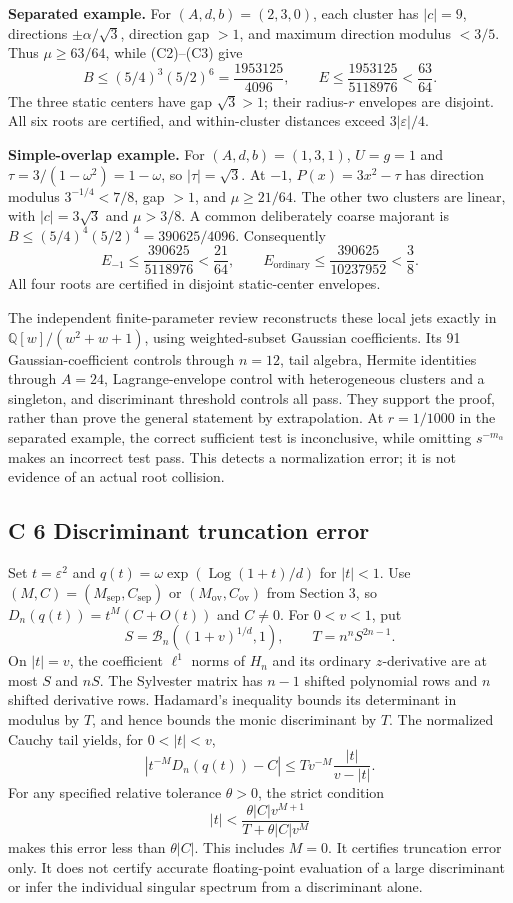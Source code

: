 \documentclass[
  11pt,
]{article}
\begin{document}
\textbf{Separated example.} For \((A,d,b)=(2,3,0)\), each cluster
has \(|c|=9\), directions \(\pm\alpha/\sqrt3\), direction gap
\(>1\), and maximum direction modulus \(<3/5\). Thus
\(\mu\geq63/64\), while (C2)--(C3) give
\[
B\leq(5/4)^3(5/2)^6=\frac{1953125}{4096},\qquad
E\leq\frac{1953125}{5118976}<\frac{63}{64}.
\tag{C14}
\]
The three static centers have gap \(\sqrt3>1\); their radius-\(r\)
envelopes are disjoint. All six roots are certified, and within-cluster
distances exceed \(3|\varepsilon|/4\).

\textbf{Simple-overlap example.} For \((A,d,b)=(1,3,1)\),
\(U=g=1\) and \(\tau=3/(1-\omega^2)=1-\omega\), so
\(|\tau|=\sqrt3\). At \(-1\), \(P(x)=3x^2-\tau\) has direction
modulus \(3^{-1/4}<7/8\), gap \(>1\), and
\(\mu\geq21/64\). The other two clusters are linear, with
\(|c|=3\sqrt3\) and \(\mu>3/8\). A common deliberately coarse
majorant is \(B\leq(5/4)^4(5/2)^4=390625/4096\). Consequently
\[
E_{-1}\leq\frac{390625}{5118976}<\frac{21}{64},\qquad
E_{\mathrm{ordinary}}\leq\frac{390625}{10237952}<\frac38.
\tag{C15}
\]
All four roots are certified in disjoint static-center envelopes.

The independent finite-parameter review reconstructs these local jets
exactly in \(\mathbb Q[w]/(w^2+w+1)\), using weighted-subset Gaussian
coefficients. Its 91 Gaussian-coefficient controls through \(n=12\),
tail algebra, Hermite identities through \(A=24\), Lagrange-envelope
control with heterogeneous clusters and a singleton, and discriminant
threshold controls all pass. They support the proof, rather than prove
the general statement by extrapolation. At \(r=1/1000\) in the
separated example, the correct sufficient test is inconclusive, while
omitting \(s^{-m_\alpha}\) makes an incorrect test pass. This detects a
normalization error; it is not evidence of an actual root collision.

\subsection{C 6 Discriminant truncation error}

Set \(t=\varepsilon^2\) and
\(q(t)=\omega\exp(\operatorname{Log}(1+t)/d)\) for \(|t|<1\).
Use \((M,C)=(M_{\mathrm{sep}},C_{\mathrm{sep}})\) or
\((M_{\mathrm{ov}},C_{\mathrm{ov}})\) from Section 3, so
\(D_n(q(t))=t^M(C+O(t))\) and \(C\ne0\). For \(0<v<1\), put
\[
S=\mathcal B_n((1+v)^{1/d},1),\qquad T=n^nS^{2n-1}.
\]
On \(|t|=v\), the coefficient \(\ell^1\) norms of \(H_n\) and
its ordinary \(z\)-derivative are at most \(S\) and \(nS\).
The Sylvester matrix has \(n-1\) shifted polynomial rows and \(n\)
shifted derivative rows. Hadamard's inequality bounds its determinant
in modulus by \(T\), and hence bounds the monic discriminant by
\(T\). The normalized Cauchy tail yields, for \(0<|t|<v\),
\[
|t^{-M}D_n(q(t))-C|\leq T v^{-M}\frac{|t|}{v-|t|}. \tag{C16}
\]
For any specified relative tolerance \(\theta>0\), the strict condition
\[
|t|<\frac{\theta|C|v^{M+1}}{T+\theta|C|v^M} \tag{C17}
\]
makes this error less than \(\theta|C|\). This includes \(M=0\).
It certifies truncation error only. It does not certify accurate
floating-point evaluation of a large discriminant or infer the
individual singular spectrum from a discriminant alone.
\end{document}
